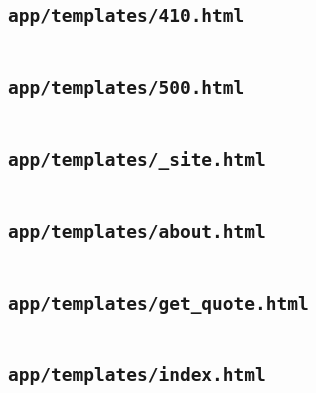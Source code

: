 \subsection{\texttt{app/templates/410.html}}
\begin{codelisting}
\inputminted[breakanywhere]{html+jinja}{../uswacs-2-iy2d502-salapp/app/templates/410.html}\end{codelisting}
\subsection{\texttt{app/templates/500.html}}
\begin{codelisting}
\inputminted[breakanywhere]{html+jinja}{../uswacs-2-iy2d502-salapp/app/templates/500.html}\end{codelisting}
\subsection{\texttt{app/templates/\_site.html}}
\begin{codelisting}
\inputminted[breakanywhere]{html+jinja}{../uswacs-2-iy2d502-salapp/app/templates/_site.html}\end{codelisting}
\subsection{\texttt{app/templates/about.html}}
\begin{codelisting}
\inputminted[breakanywhere]{html+jinja}{../uswacs-2-iy2d502-salapp/app/templates/about.html}\end{codelisting}
\subsection{\texttt{app/templates/get\_quote.html}}
\begin{codelisting}
\inputminted[breakanywhere]{html+jinja}{../uswacs-2-iy2d502-salapp/app/templates/get_quote.html}\end{codelisting}
\subsection{\texttt{app/templates/index.html}}
\begin{codelisting}
\inputminted[breakanywhere]{html+jinja}{../uswacs-2-iy2d502-salapp/app/templates/index.html}\end{codelisting}
